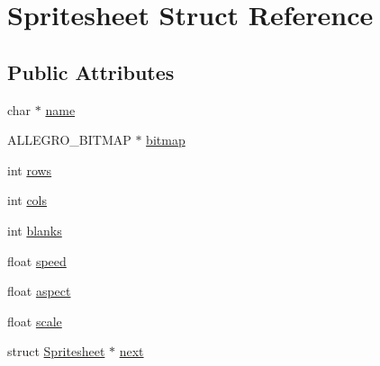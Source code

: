 \hypertarget{structSpritesheet}{\section{\-Spritesheet \-Struct \-Reference}
\label{structSpritesheet}
}
\subsection*{\-Public \-Attributes}
\begin{DoxyCompactItemize}
\item 
char $\ast$ \hyperlink{structSpritesheet_a6788d53f825bd74cda7e50e75435befa}{name}
\item 
\-A\-L\-L\-E\-G\-R\-O\-\_\-\-B\-I\-T\-M\-A\-P $\ast$ \hyperlink{structSpritesheet_ad31be6e59349586862e6a813ea139bcb}{bitmap}
\item 
int \hyperlink{structSpritesheet_aeab321ce6cdd45cc8a5078e80480510e}{rows}
\item 
int \hyperlink{structSpritesheet_a3d512755ce492a35e1816fe026cc37c9}{cols}
\item 
int \hyperlink{structSpritesheet_a5010b18959949b1c577078f94a810ef3}{blanks}
\item 
float \hyperlink{structSpritesheet_ad011770ca540de2bad85f0cb155c774b}{speed}
\item 
float \hyperlink{structSpritesheet_a85c93c8d80227725374e1581c4c8e049}{aspect}
\item 
float \hyperlink{structSpritesheet_ac46cf3d01609f66aae140e3b7d3d1109}{scale}
\item 
struct \hyperlink{structSpritesheet}{\-Spritesheet} $\ast$ \hyperlink{structSpritesheet_a671f77f759138aa2c852e5252b6daac5}{next}
\end{DoxyCompactItemize}


